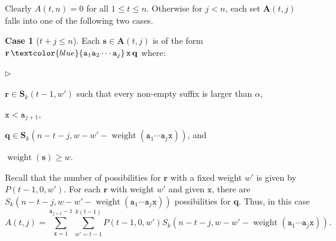 \documentclass[US-letter,USenglish,authorcolumns,autoref]{lipics-v2021}
\renewcommand{\tt} {\mathtt}
\newcommand{\squishlisttwo}{
 \begin{list}{$\triangleright$}
  { \setlength{\itemsep}{0pt}
     \setlength{\parsep}{0pt}
    \setlength{\topsep}{0pt}
    \setlength{\partopsep}{0pt}
    \setlength{\leftmargin}{2em}
    \setlength{\labelwidth}{1.5em}
    \setlength{\labelsep}{0.5em} } }
\newcommand{\squishend}{
  \end{list}  }
\newcommand{\bS}{\mathbf{S}}
\newcommand{\bs}{\mathbf{s}}
\newcommand{\br}{\mathbf{r}}
\newcommand{\bq}{\mathbf{q}}
\newcommand{\blue}[1] {\textcolor{blue}{#1}}
\DeclareMathOperator{\wt}{weight}
\begin{document}
\noindent
Clearly $A(t,n) = 0$ for all $1 \leq t \leq n$.  Otherwise for $j<n$, each set $\mathbf{A}(t,j)$ falls into one of the following two cases.
\medskip

\noindent
{\bf Case 1} ($t+j \leq n$).  Each $\bs \in \mathbf{A}(t,j)$ is of the form
$\br\,\blue{\tt{a}_1\tt{a}_2\cdots \tt{a}_j}\,\tt{x}\,\bq$ where:
\squishlisttwo
\item $\br \in \bS_k(t-1,w')$ such that every non-empty suffix is larger than $\alpha$, 
\item $\tt{x} < \tt{a}_{j+1}$,
\item $\bq \in \bS_k(n-t-j,w-w'-\wt(\tt{a}_1\cdots \tt{a}_j\tt{x}))$, and 
\item $\wt(\bs) \geq w$.
\squishend

\noindent   
Recall that the number of possibilities for $\br$ with a fixed weight $w'$ is given by $P(t{-}1,0,w')$. 
For each $\br$ with weight $w'$ and given 
$\tt{x}$, there are $S_k(n-t-j,w-w'-\wt(\tt{a}_1\cdots \tt{a}_j\tt{x}))$ possibilities for $\bq$. Thus, in this case
\[ A(t,j)  = \sum_{\tt{x} = 1}^{\tt{a}_{j+1}-1}
\sum_{w'=t-1}^{k(t-1)} P(t-1,0,w')S_k(n-t-j, w-w'-\wt(\tt{a}_1\cdots \tt{a}_j\tt{x}))
. \]
\end{document}

